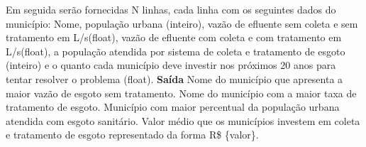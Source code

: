 \documentclass[a4paper, 12pt]{article}
\begin{document}
Em seguida serão fornecidas N linhas, cada linha com os seguintes dados do município: Nome, população urbana (inteiro), vazão de efluente sem coleta e sem tratamento em L/s(float), vazão de efluente com coleta e com tratamento em L/s(float), a população atendida por sistema de coleta e tratamento de esgoto (inteiro) e o quanto cada município deve investir nos próximos 20 anos para tentar resolver o problema (float).
\newline \newline
\textbf{{\large Saída}} \newline
\newline
Nome do município que apresenta a maior vazão de esgoto sem tratamento. 
\newline
Nome do município com a maior taxa de tratamento de esgoto.
\newline
Município com maior percentual da população urbana atendida com esgoto sanitário.
\newline
Valor médio que os municípios investem em coleta e tratamento de esgoto representado da forma R\$ \{valor\}.
\newline \newline
\end{document}
